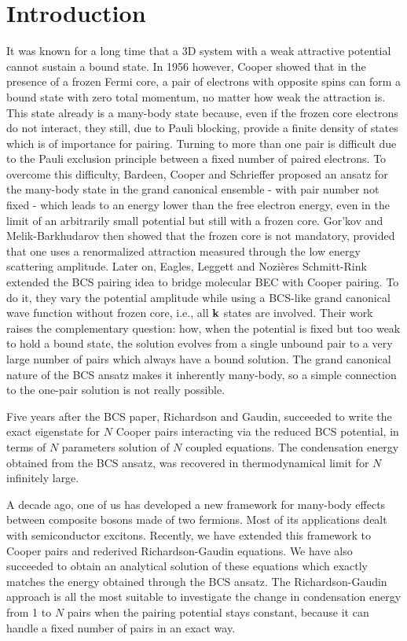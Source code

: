 \documentclass[5p,twocolumn]{elsarticle}
\begin{document}
\section{Introduction}
It was known for a long time that a 3D system with a weak attractive potential cannot sustain a bound state.  In 1956 however, Cooper showed that in the presence of a frozen Fermi core, a pair of electrons with opposite spins can form a bound state with zero total momentum,  no matter how weak the attraction is\cite{Cooper}.  This state already is a many-body state because, even if the frozen core electrons do not interact, they still, due to Pauli blocking, provide a finite density of states which is of importance for pairing. Turning to more than one pair is difficult due to the Pauli exclusion principle between a fixed number of paired electrons. To overcome this difficulty, Bardeen, Cooper and Schrieffer proposed an ansatz for the many-body state in the grand canonical ensemble - with  pair number not fixed - which leads to an energy lower than the free electron energy, even in the limit of an arbitrarily small potential but still with a frozen core\cite{BCS}. Gor'kov and Melik-Barkhudarov then showed that the frozen core is not
  mandatory, provided that one uses a renormalized attraction measured through the low energy scattering amplitude\cite{Gorkov}.   Later on, Eagles\cite{Eagle}, Leggett\cite{LeggettCrossover} and Nozi\`{e}res Schmitt-Rink\cite{Nozieres} extended the BCS pairing idea to bridge molecular BEC with Cooper pairing. To do it, they vary the potential amplitude while using a BCS-like grand canonical wave function without frozen core, i.e., all $\mathbf{k}$ states are involved.  Their work raises the complementary question: how, when the potential is fixed but too weak to hold a bound state, the solution evolves from a single unbound pair to a very large number of pairs which always have a bound solution. The grand canonical nature of the BCS ansatz makes it inherently many-body, so a simple connection to the one-pair solution is not really possible.  

Five years after the BCS paper, Richardson\cite{Richardson1} and Gaudin\cite{gaudin}, succeeded to write the exact eigenstate for $N$ Cooper pairs interacting via the reduced BCS potential, in terms of $N$ parameters solution of $N$ coupled equations. The condensation energy obtained from the BCS ansatz, was recovered in thermodynamical limit for $N$ infinitely large\cite{Richardson2,Richardson3,Richardson1968}. 

A decade ago, one of us has developed a new framework\cite{CobosonPhysicsReports} for many-body effects between composite bosons made of two fermions. Most of its applications dealt with semiconductor excitons.   Recently, we have extended this framework to Cooper pairs and rederived Richardson-Gaudin equations\cite{CobosonBcsRich}. We have also succeeded to obtain an analytical solution of these equations \cite{moth,combescotBCS} which exactly matches the energy obtained through the BCS ansatz.  The Richardson-Gaudin approach is all the most suitable to investigate the change in condensation energy from 1 to $N$ pairs when the pairing potential stays constant, because it can handle a fixed number of pairs in an exact way.
\end{document}
